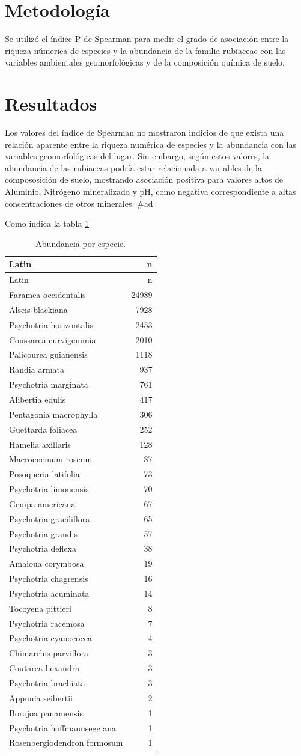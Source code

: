 \documentclass[11pt,]{article}
\begin{document}
\section{Metodología}\label{metodologuxeda}

Se utilizó el índice P de Spearman para medir el grado de asociación
entre la riqueza númerica de especies y la abundancia de la familia
rubiaceae con las variables ambientales geomorfológicas y de la
composición química de suelo.

\section{Resultados}\label{resultados}

Los valores del índice de Spearman no mostraron indicios de que exista
una relación aparente entre la riqueza numérica de especies y la
abundancia con las variables geomorfológicas del lugar. Sin embargo,
según estos valores, la abundancia de las rubiaceas podría estar
relacionada a variables de la compososición de suelo, mostrando
asociación positiva para valores altos de Aluminio, Nitrógeno
mineralizado y pH, como negativa correspondiente a altas concentraciones
de otros minerales. \#ad

Como indica la tabla \ref{tab:abun_sp}

\begin{longtable}[]{@{}lr@{}}
\caption{\label{tab:abun_sp}Abundancia por especie.}\tabularnewline
\toprule
Latin & n\tabularnewline
\midrule
\endfirsthead
\toprule
Latin & n\tabularnewline
\midrule
\endhead
Faramea occidentalis & 24989\tabularnewline
Alseis blackiana & 7928\tabularnewline
Psychotria horizontalis & 2453\tabularnewline
Coussarea curvigemmia & 2010\tabularnewline
Palicourea guianensis & 1118\tabularnewline
Randia armata & 937\tabularnewline
Psychotria marginata & 761\tabularnewline
Alibertia edulis & 417\tabularnewline
Pentagonia macrophylla & 306\tabularnewline
Guettarda foliacea & 252\tabularnewline
Hamelia axillaris & 128\tabularnewline
Macrocnemum roseum & 87\tabularnewline
Posoqueria latifolia & 73\tabularnewline
Psychotria limonensis & 70\tabularnewline
Genipa americana & 67\tabularnewline
Psychotria graciliflora & 65\tabularnewline
Psychotria grandis & 57\tabularnewline
Psychotria deflexa & 38\tabularnewline
Amaioua corymbosa & 19\tabularnewline
Psychotria chagrensis & 16\tabularnewline
Psychotria acuminata & 14\tabularnewline
Tocoyena pittieri & 8\tabularnewline
Psychotria racemosa & 7\tabularnewline
Psychotria cyanococca & 4\tabularnewline
Chimarrhis parviflora & 3\tabularnewline
Coutarea hexandra & 3\tabularnewline
Psychotria brachiata & 3\tabularnewline
Appunia seibertii & 2\tabularnewline
Borojoa panamensis & 1\tabularnewline
Psychotria hoffmannseggiana & 1\tabularnewline
Rosenbergiodendron formosum & 1\tabularnewline
\bottomrule
\end{longtable}
\end{document}
